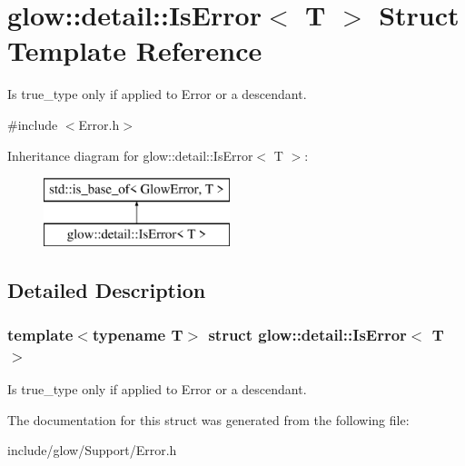 \hypertarget{structglow_1_1detail_1_1_is_error}{}\section{glow\+:\+:detail\+:\+:Is\+Error$<$ T $>$ Struct Template Reference}
\label{structglow_1_1detail_1_1_is_error}


Is true\+\_\+type only if applied to Error or a descendant.  




{\ttfamily \#include $<$Error.\+h$>$}

Inheritance diagram for glow\+:\+:detail\+:\+:Is\+Error$<$ T $>$\+:\begin{figure}[H]
\begin{center}
\leavevmode
\includegraphics[height=2.000000cm]{structglow_1_1detail_1_1_is_error}
\end{center}
\end{figure}


\subsection{Detailed Description}
\subsubsection*{template$<$typename T$>$\newline
struct glow\+::detail\+::\+Is\+Error$<$ T $>$}

Is true\+\_\+type only if applied to Error or a descendant. 

The documentation for this struct was generated from the following file\+:\begin{DoxyCompactItemize}
\item 
include/glow/\+Support/Error.\+h\end{DoxyCompactItemize}
